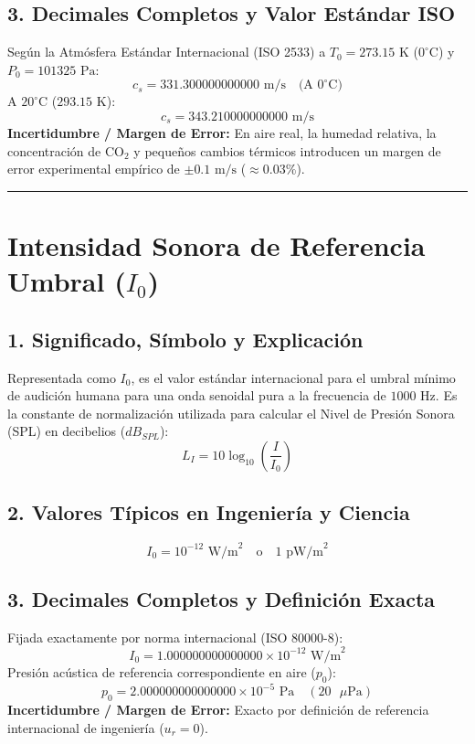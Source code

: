 \documentclass[12pt,a4paper]{article}
\begin{document}
\subsection*{3. Decimales Completos y Valor Estándar ISO}
Según la Atmósfera Estándar Internacional (ISO 2533) a $T_0 = 273.15\text{ K}$ ($0^\circ\text{C}$) y $P_0 = 101325\text{ Pa}$:
\begin{equation*}
c_s = 331.300000000000 \text{ m/s} \quad \text{(A } 0^\circ\text{C)}
\end{equation*}
A $20^\circ\text{C}$ ($293.15\text{ K}$):
\begin{equation*}
c_s = 343.210000000000 \text{ m/s}
\end{equation*}
\textbf{Incertidumbre / Margen de Error:} En aire real, la humedad relativa, la concentración de $\text{CO}_2$ y pequeños cambios térmicos introducen un margen de error experimental empírico de $\pm 0.1 \text{ m/s}$ ($\approx 0.03\%$).

\vspace{0.8cm}
\hrule
\vspace{0.8cm}

\section{Intensidad Sonora de Referencia Umbral ($I_0$)}

\subsection*{1. Significado, Símbolo y Explicación}
Representada como $I_0$, es el valor estándar internacional para el umbral mínimo de audición humana para una onda senoidal pura a la frecuencia de $1000 \text{ Hz}$. Es la constante de normalización utilizada para calcular el Nivel de Presión Sonora (SPL) en decibelios ($dB_{SPL}$):
\begin{equation*}
L_I = 10 \log_{10} \left( \frac{I}{I_0} \right)
\end{equation*}

\subsection*{2. Valores Típicos en Ingeniería y Ciencia}
\begin{equation*}
I_0 = 10^{-12} \text{ W/m}^2 \quad \text{o} \quad 1 \text{ pW/m}^2
\end{equation*}

\subsection*{3. Decimales Completos y Definición Exacta}
Fijada exactamente por norma internacional (ISO 80000-8):
\begin{equation*}
I_0 = 1.000000000000000 \times 10^{-12} \text{ W/m}^2
\end{equation*}
Presión acústica de referencia correspondiente en aire ($p_0$):
\begin{equation*}
p_0 = 2.000000000000000 \times 10^{-5} \text{ Pa} \quad (20 \text{ }\mu\text{Pa})
\end{equation*}
\textbf{Incertidumbre / Margen de Error:} Exacto por definición de referencia internacional de ingeniería ($u_r = 0$).
\end{document}
